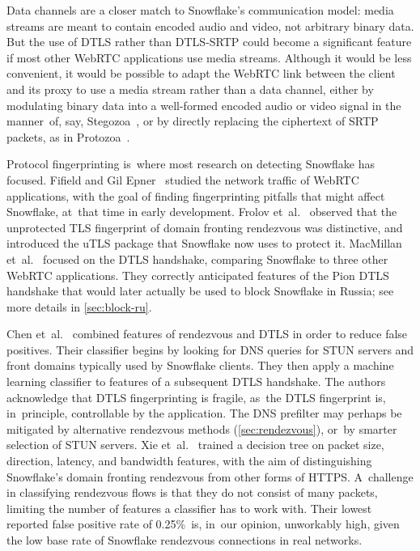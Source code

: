 \documentclass[letterpaper,twocolumn]{article}
\begin{document}
\begin{description}
Data channels are a closer match to Snowflake's communication model:
media streams are meant to contain encoded audio and video,
not arbitrary binary data.
But the use of DTLS rather than DTLS-SRTP could become
a significant feature if most other WebRTC applications use media streams.
Although it would be less convenient,
it would be possible to adapt the WebRTC link between
the client and its proxy
to use a media stream rather than a data channel,
either by modulating binary data into a well-formed encoded
audio or video signal in the manner~of, say,
Stegozoa~\cite[\S 3.3]{Figueira2022a},
or by directly replacing the ciphertext of SRTP packets,
as in Protozoa~\cite[\S 4.4]{Barradas2020a}.

\end{description}

Protocol fingerprinting
is~where most research on detecting Snowflake has focused.
Fifield and Gil Epner~\cite{arxiv.1605.08805}
studied the network traffic of WebRTC applications,
with the goal of finding fingerprinting pitfalls
that might affect Snowflake, at~that time in early development.
Frolov et~al.~\cite[\S \mbox{V-C}]{Frolov2019a}
observed that the unprotected TLS fingerprint
of domain fronting rendezvous was distinctive,
and introduced the uTLS package that Snowflake
now uses to protect it.
MacMillan et~al.~\cite{arxiv.2008.03254}
focused on the DTLS handshake,
comparing Snowflake to three other WebRTC applications.
They correctly anticipated features
of the Pion DTLS handshake
that would later actually be used
to block Snowflake in Russia;
see more details in \autoref{sec:block-ru}.

Chen et~al.~\cite{Chen2023a}
combined features
of rendezvous and DTLS
in order to reduce false positives.
Their classifier begins
by looking for DNS queries for
STUN servers and front domains typically used by Snowflake clients.
They then apply a machine learning classifier
to features of a subsequent DTLS handshake.
The authors acknowledge that DTLS fingerprinting
is fragile, as~the DTLS fingerprint is, in~principle,
controllable by the application.
The DNS prefilter may perhaps be mitigated
by alternative rendezvous methods (\autoref{sec:rendezvous}),
or~by smarter selection of STUN servers.
Xie et~al.~\cite{Xie2023a} trained a decision tree on
packet size, direction, latency, and bandwidth features, with the aim of
distinguishing Snowflake's domain fronting rendezvous
from other forms of HTTPS.
A~challenge in classifying rendezvous flows
is that they do not consist of many packets,
limiting the number of features a classifier has to work with.
Their lowest reported false positive rate of 0.25\%~is,
in~our opinion, unworkably high,
given the low base rate of Snowflake rendezvous connections in real networks.
\end{document}
